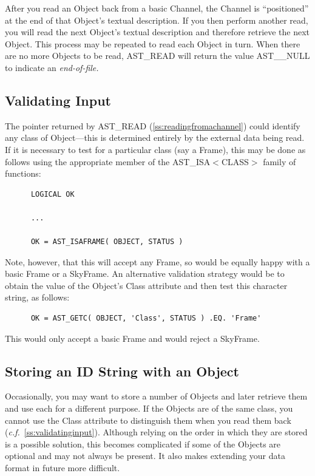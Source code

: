 \documentclass[twoside,11pt]{article}
\newcommand{\htmlref}[2]{#1}
\newcommand{\secref}[1]{\S\ref{#1}}
\renewcommand{\secref}[1]{\ref{#1}}
\begin{document}
After you read an Object back from a basic Channel, the
Channel is ``positioned'' at the end of that Object's
textual description. If you then perform another read, you will
read the next Object's textual description and therefore
retrieve the next Object.  This process may be repeated to read
each Object in turn. When there are no more Objects to be
read, \htmlref{AST\_READ}{AST_READ} will return the value AST\_\_NULL to indicate an
{\em{end-of-file.}}

\subsection{\label{ss:validatinginput}Validating Input}

The pointer returned by \htmlref{AST\_READ}{AST_READ} (\secref{ss:readingfromachannel})
could identify any class of \htmlref{Object}{Object}---this is determined entirely by
the external data being read. If it is necessary to test for a
particular class (say a \htmlref{Frame}{Frame}), this may be done as follows using the
appropriate member of the \htmlref{AST\_ISA$<$CLASS$>$}{AST_ISACLASS} family of functions:

\small
\begin{verbatim}
      LOGICAL OK

      ...

      OK = AST_ISAFRAME( OBJECT, STATUS )
\end{verbatim}
\normalsize

Note, however, that this will accept any Frame, so would be equally
happy with a basic Frame or a \htmlref{SkyFrame}{SkyFrame}.  An alternative validation
strategy would be to obtain the value of the Object's \htmlref{Class}{Class} attribute
and then test this character string, as follows:

\small
\begin{verbatim}
      OK = AST_GETC( OBJECT, 'Class', STATUS ) .EQ. 'Frame'
\end{verbatim}
\normalsize

This would only accept a basic Frame and would reject a SkyFrame.

\subsection{Storing an ID String with an Object}

Occasionally, you may want to store a number of Objects and later
retrieve them and use each for a different purpose. If the Objects are
of the same class, you cannot use the \htmlref{Class}{Class} attribute to distinguish
them when you read them back
({\em{c.f.}}~\secref{ss:validatinginput}). Although relying on the
order in which they are stored is a possible solution, this becomes
complicated if some of the Objects are optional and may not always be
present. It also makes extending your data format in future more
difficult.
\end{document}
